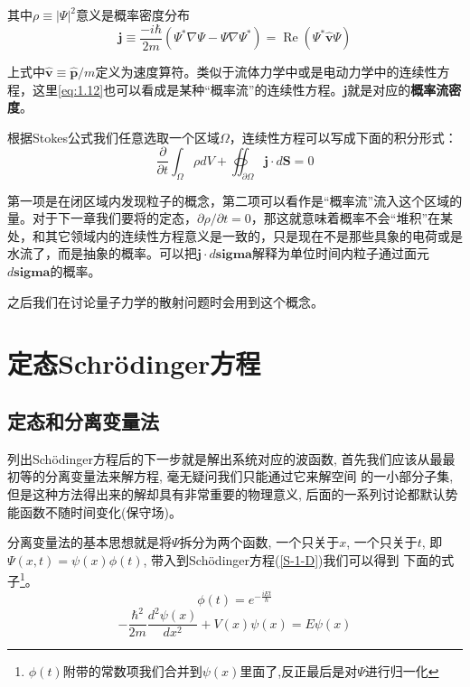 \documentclass[a4paper,zihao=-4,linespread=1]{ctexrep}
\newenvironment{lequation}{\large\begin{equation}}{\end{equation}}
\begin{document}
	其中$\rho\equiv |\Psi|^2$意义是概率密度分布
	\begin{equation}
		\boxed{
			\mathbf{j}\equiv \frac{-i\hbar}{2m}\left(\Psi^*\nabla\Psi-\Psi\nabla\Psi^*\right)=\operatorname{Re}\left(\Psi^*\hat {\mathbf{v}}\Psi\right)
		}
	\end{equation}
	
	上式中$\hat {\mathbf{v}}\equiv \hat {\mathbf{p}}/m$定义为速度算符。类似于流体力学中或是电动力学中的连续性方程，这里\ref{eq:1.12}也可以看成是某种“概率流”的连续性方程。$\mathbf{j}$就是对应的\textbf{概率流密度}。
	
	根据Stokes公式我们任意选取一个区域$\Omega$，连续性方程可以写成下面的积分形式：
	\[\frac{\partial }{\partial t}\int_{\Omega}\rho dV+\oiint_{\partial\Omega}\mathbf{j}\cdot d\mathbf{S}=0\]
	
	第一项是在闭区域内发现粒子的概念，第二项可以看作是“概率流”流入这个区域的量。对于下一章我们要将的定态，$\partial \rho/\partial t=0$，那这就意味着概率不会“堆积”在某处，和其它领域内的连续性方程意义是一致的，只是现在不是那些具象的电荷或是水流了，而是抽象的概率。可以把$\mathbf{j}\cdot d\mathbf{sigma}$解释为单位时间内粒子通过面元$ d\mathbf{sigma}$的概率。
	
	之后我们在讨论量子力学的散射问题时会用到这个概念。
    \newpage
    \chapter{定态Schr\"{o}dinger方程}
    \section{定态和分离变量法}
    列出Sch\"{o}dinger方程后的下一步就是解出系统对应的波函数, 首先我们应该从最最初等的分离变量法来解方程, 毫无疑问我们只能通过它来解空间
    的一小部分子集, 但是这种方法得出来的解却具有非常重要的物理意义, 后面的一系列讨论都默认势能函数不随时间变化(保守场)。

    分离变量法的基本思想就是将$\Psi$拆分为两个函数, 一个只关于$x$, 一个只关于$t$, 即$\Psi(x,t)=\psi(x)\phi(t)$, 带入到Sch\"{o}dinger方程(\ref{S-1-D})我们可以得到
    下面的式子\footnote{$\phi(t)$附带的常数项我们合并到$\psi(x)$里面了,反正最后是对$\Psi$进行归一化}。
    \begin{lequation}
        \label{wiggle-function}
        \boxed{
            \phi(t)=e^{-\frac{iEt}{\hbar}}
        }
    \end{lequation}
    \begin{lequation}
        \label{time-independent-equation}
        \boxed{
            -\frac{\hbar^2}{2m}\frac{d^2\psi(x)}{dx^2}+V(x)\psi(x)=E\psi(x)
        }
    \end{lequation}
\end{document}
